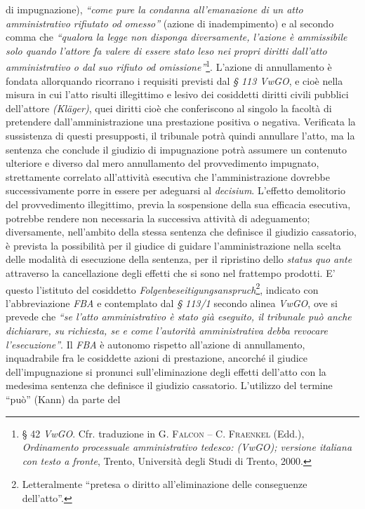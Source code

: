 \documentclass[12pt,it,a4paper,]{report}
\begin{document}
di impugnazione), \emph{``come pure la condanna all'emanazione di un
atto amministrativo rifiutato od omesso''} (azione di inadempimento) e
al secondo comma che \emph{``qualora la legge non disponga diversamente,
l'azione è ammissibile solo quando l'attore fa valere di essere stato
leso nei propri diritti dall'atto amministrativo o dal suo rifiuto od
omissione''}\footnote{§ 42 \emph{VwGO}. Cfr. traduzione in G.
  \textsc{Falcon} -- C. \textsc{Fraenkel} (Edd.), \emph{Ordinamento
  processuale amministrativo tedesco: (VwGO); versione italiana con
  testo a fronte}, Trento, Università degli Studi di Trento, 2000.}.
L'azione di annullamento è fondata allorquando ricorrano i requisiti
previsti dal \emph{§ 113 VwGO}, e cioè nella misura in cui l'atto
risulti illegittimo e lesivo dei cosiddetti diritti civili pubblici
dell'attore \emph{(Kläger)}, quei diritti cioè che conferiscono al
singolo la facoltà di pretendere dall'amministrazione una prestazione
positiva o negativa. Verificata la sussistenza di questi presupposti, il
tribunale potrà quindi annullare l'atto, ma la sentenza che conclude il
giudizio di impugnazione potrà assumere un contenuto ulteriore e diverso
dal mero annullamento del provvedimento impugnato, strettamente
correlato all'attività esecutiva che l'amministrazione dovrebbe
successivamente porre in essere per adeguarsi al \emph{decisium}.
L'effetto demolitorio del provvedimento illegittimo, previa la
sospensione della sua efficacia esecutiva, potrebbe rendere non
necessaria la successiva attività di adeguamento; diversamente,
nell'ambito della stessa sentenza che definisce il giudizio cassatorio,
è prevista la possibilità per il giudice di guidare l'amministrazione
nella scelta delle modalità di esecuzione della sentenza, per il
ripristino dello \emph{status quo ante} attraverso la cancellazione
degli effetti che si sono nel frattempo prodotti. E' questo l'istituto
del cosiddetto \emph{Folgenbeseitigungsanspruch}\footnote{Letteralmente
  ``pretesa o diritto all'eliminazione delle conseguenze dell'atto''.},
indicato con l'abbreviazione \emph{FBA} e contemplato dal \emph{§ 113/1}
secondo alinea \emph{VwGO}, ove si prevede che \emph{``se l'atto
amministrativo è stato già eseguito, il tribunale può anche dichiarare,
su richiesta, se e come l'autorità amministrativa debba revocare
l'esecuzione''}. Il \emph{FBA} è autonomo rispetto all'azione di
annullamento, inquadrabile fra le cosiddette azioni di prestazione,
ancorché il giudice dell'impugnazione si pronunci sull'eliminazione
degli effetti dell'atto con la medesima sentenza che definisce il
giudizio cassatorio. L'utilizzo del termine ``può'' (Kann) da parte del
\end{document}
